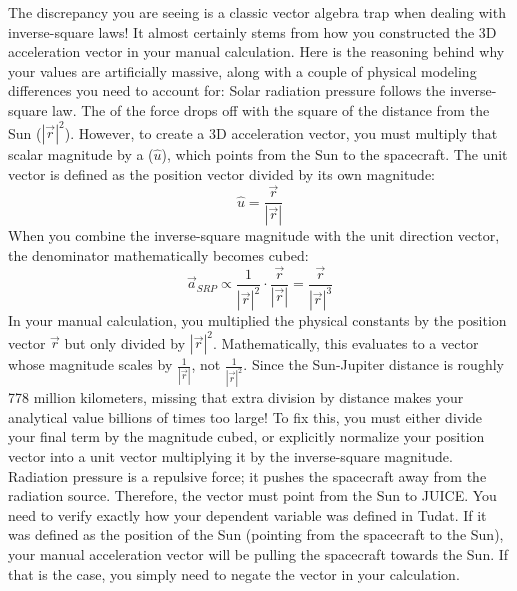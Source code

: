 {}The discrepancy you are seeing is a classic vector algebra trap when dealing with inverse-square laws! It almost certainly stems from how you constructed the 3D acceleration vector in your manual calculation.\markdownRendererInterblockSeparator
{}Here is the reasoning behind why your values are artificially massive, along with a couple of physical modeling differences you need to account for:\markdownRendererInterblockSeparator
{}\markdownRendererSectionBegin
{}\markdownRendererInterblockSeparator
{}Solar radiation pressure follows the inverse-square law. The  of the force drops off with the square of the distance from the Sun ($|\vec{r}|^2$).\markdownRendererInterblockSeparator
{}However, to create a 3D acceleration vector, you must multiply that scalar magnitude by a  ($\hat{u}$), which points from the Sun to the spacecraft. The unit vector is defined as the position vector divided by its own magnitude:\markdownRendererInterblockSeparator
{}$$\hat{u} = \frac{\vec{r}}{|\vec{r}|}$$\markdownRendererInterblockSeparator
{}When you combine the inverse-square magnitude with the unit direction vector, the denominator mathematically becomes cubed:\markdownRendererInterblockSeparator
{}$$\vec{a}_{SRP} \propto \frac{1}{|\vec{r}|^2} \cdot \frac{\vec{r}}{|\vec{r}|} = \frac{\vec{r}}{|\vec{r}|^3}$$\markdownRendererInterblockSeparator
{}In your manual calculation, you multiplied the physical constants by the position vector $\vec{r}$ but only divided by $|\vec{r}|^2$. Mathematically, this evaluates to a vector whose magnitude scales by $\frac{1}{|\vec{r}|}$, not $\frac{1}{|\vec{r}|^2}$. Since the Sun-Jupiter distance is roughly 778 million kilometers, missing that extra division by distance makes your analytical value billions of times too large!\markdownRendererInterblockSeparator
{}To fix this, you must either divide your final term by the magnitude cubed, or explicitly normalize your position vector into a unit vector  multiplying it by the inverse-square magnitude.\markdownRendererInterblockSeparator
{}
\markdownRendererSectionEnd \markdownRendererSectionBegin
{}\markdownRendererInterblockSeparator
{}Radiation pressure is a repulsive force; it pushes the spacecraft away from the radiation source. Therefore, the vector must point from the Sun to JUICE.\markdownRendererInterblockSeparator
{}You need to verify exactly how your  dependent variable was defined in Tudat. If it was defined as the position of the Sun  (pointing from the spacecraft to the Sun), your manual acceleration vector will be pulling the spacecraft towards the Sun. If that is the case, you simply need to negate the vector in your calculation.\markdownRendererInterblockSeparator
